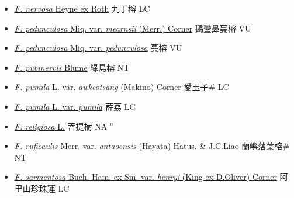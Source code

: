 \begin{itemize}
\begin{itemize}
        \item[] \href{http://www.theplantlist.org/tpl1.1/search?q=Ficus+nervosa}{\textit{F. nervosa} Heyne ex Roth}   九丁榕 LC
        \item[] \href{http://www.theplantlist.org/tpl1.1/search?q=Ficus+pedunculosa+var.+mearnsii}{\textit{F. pedunculosa} Miq. var. \textit{mearnsii} (Merr.) Corner}   鵝鑾鼻蔓榕 VU
        \item[] \href{http://www.theplantlist.org/tpl1.1/search?q=Ficus+pedunculosa+var.+pedunculosa}{\textit{F. pedunculosa} Miq. var. \textit{pedunculosa}}   蔓榕 VU
        \item[] \href{http://www.theplantlist.org/tpl1.1/search?q=Ficus+pubinervis}{\textit{F. pubinervis} Blume}   綠島榕 NT
        \item[] \href{http://www.theplantlist.org/tpl1.1/search?q=Ficus+pumila+var.+awkeotsang}{\textit{F. pumila} L. var. \textit{awkeotsang} (Makino) Corner}   愛玉子\# LC
        \item[] \href{http://www.theplantlist.org/tpl1.1/search?q=Ficus+pumila+var.+pumila}{\textit{F. pumila} L. var. \textit{pumila}}   薜荔 LC
        \item[] \href{http://www.theplantlist.org/tpl1.1/search?q=Ficus+religiosa}{\textit{F. religiosa} L.}   菩提樹 NA $^n$
        \item[] \href{http://www.theplantlist.org/tpl1.1/search?q=Ficus+ruficaulis+var.+antaoensis}{\textit{F. ruficaulis} Merr. var. \textit{antaoensis} (Hayata) Hatus. \& J.C.Liao}   蘭嶼落葉榕\# NT
        \item[] \href{http://www.theplantlist.org/tpl1.1/search?q=Ficus+sarmentosa+var.+henryi}{\textit{F. sarmentosa} Buch.-Ham. ex Sm. var. \textit{henryi} (King ex D.Oliver) Corner}   阿里山珍珠蓮 LC

\end{itemize}
\end{itemize}
